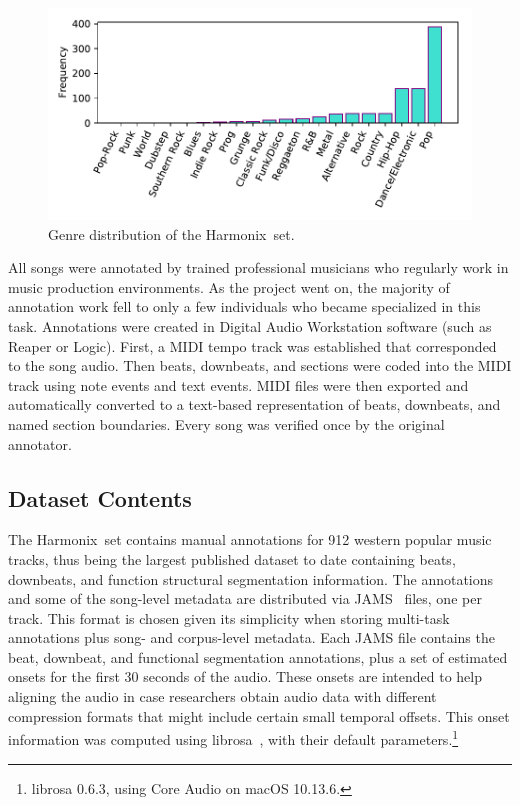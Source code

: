 \documentclass{article}
\newcommand{\setName}{Harmonix}
\begin{document}
\begin{figure}
    \centerline{\includegraphics[width=\columnwidth]{figs/PublishedGenres_distribution.pdf}}
    \caption{Genre distribution of the \setName~set.}
    \label{fig:genres_dist}
\end{figure}

All songs were annotated by trained professional musicians who regularly work in music production environments. As the project went on, the majority of annotation work fell to only a few individuals who became specialized in this task. Annotations were created in Digital Audio Workstation software (such as Reaper or Logic). First, a MIDI tempo track was established that corresponded to the song audio. Then beats, downbeats, and sections were coded into the MIDI track using note events and text events. MIDI files were then exported and automatically converted to a text-based representation of beats, downbeats, and named section boundaries. Every song was verified once by the original annotator.


\subsection{Dataset Contents}

The \setName~set contains manual annotations for 912 western popular music tracks, thus being the largest published  dataset to date containing beats, downbeats, and function structural segmentation information.
The annotations and some of the song-level metadata are distributed via JAMS~\cite{Humphrey2014} files, one per track.
This format is chosen given its simplicity when storing multi-task annotations plus song- and corpus-level metadata.
Each JAMS file contains the beat, downbeat, and functional segmentation annotations, plus a set of estimated onsets for the first 30 seconds of the audio.
These onsets are intended to help aligning the audio in case researchers obtain audio data with different compression formats that might include certain small temporal offsets.
This onset information was computed using librosa~\cite{Mcfee2015a}, with their default parameters.\footnote{librosa 0.6.3, using Core Audio on macOS 10.13.6.}
\end{document}
